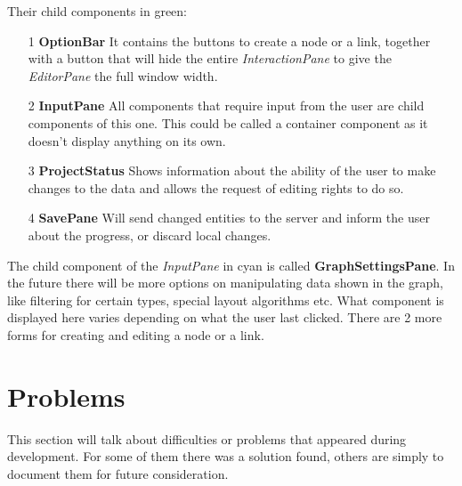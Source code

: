 Their child components in green:
\begin{itemize}
\item[1] \textbf{OptionBar} It contains the buttons to create a node or a link, together with a button that will hide the entire \emph{InteractionPane} to give the \emph{EditorPane} the full window width.
\item[2] \textbf{InputPane} All components that require input from the user are child components of this one. This could be called a container component as it doesn't display anything on its own.
\item[3] \textbf{ProjectStatus} Shows information about the ability of the user to make changes to the data and allows the request of editing rights to do so.
\item[4] \textbf{SavePane} Will send changed entities to the server and inform the user about the progress, or discard local changes.
\end{itemize}

The child component of the \emph{InputPane} in cyan is called \textbf{GraphSettingsPane}. In the future there will be more options on manipulating data shown in the graph, like filtering for certain types, special layout algorithms etc. What component is displayed here varies depending on what the user last clicked. There are 2 more forms for creating and editing a node or a link.

\section{Problems}
This section will talk about difficulties or problems that appeared during development. For some of them there was a solution found, others are simply to document them for future consideration.

